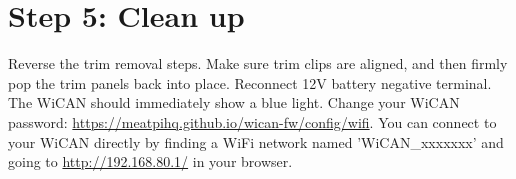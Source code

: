 \documentclass[superscriptaddress,onecolumn,floatfix]{revtex4-2}
\begin{document}
\section{Step 5: Clean up} \label{sect:5}
Reverse the trim removal steps. Make sure trim clips are aligned, and then firmly pop the trim panels back into place. Reconnect 12V battery negative terminal. The WiCAN should immediately show a blue light. Change your WiCAN password: \href{https://meatpihq.github.io/wican-fw/config/wifi}{https://meatpihq.github.io/wican-fw/config/wifi}. You can connect to your WiCAN directly by finding a WiFi network named 'WiCAN\_xxxxxxx' and going to \href{http://192.168.80.1/}{http://192.168.80.1/} in your browser.
\end{document}
